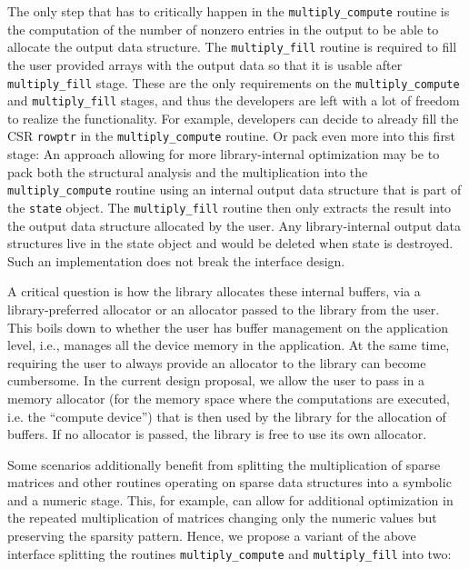 \documentclass{article}
\begin{document}
The only step that has to critically happen in the \texttt{multiply\_compute} routine is the computation of the number of nonzero entries in the output to be able to allocate the output data structure. The \texttt{multiply\_fill} routine is required to fill the user provided arrays with the output data so that it is usable after \texttt{multiply\_fill} stage. These are the only requirements on the \texttt{multiply\_compute} and \texttt{multiply\_fill} stages, and thus the developers are left with a lot of freedom to realize the functionality. For example, developers can decide to already fill the CSR \texttt{rowptr} in the \texttt{multiply\_compute} routine. Or pack even more into this first stage: An approach allowing for more library-internal optimization may be to pack both the structural analysis and the multiplication into the \texttt{multiply\_compute} routine using an internal output data structure that is part of the \texttt{state} object. The \texttt{multiply\_fill} routine then only extracts the result into the output data structure allocated by the user. Any library-internal output data structures live in the state object and would be deleted when state is destroyed. Such an implementation does not break the interface design.

A critical question is how the library allocates these internal buffers, via a library-preferred allocator or an allocator passed to the library from the user. This boils down to whether the user has buffer management on the application level, i.e., manages all the device memory in the application. At the same time, requiring the user to always provide an allocator to the library can become cumbersome. In the current design proposal, we allow the user to pass in a memory allocator (for the memory space where the computations are executed, i.e. the ``compute device'') that is then used by the library for the allocation of buffers. If no allocator is passed, the library is free to use its own allocator.

Some scenarios additionally benefit from splitting the multiplication of sparse matrices and other routines operating on sparse data structures into a symbolic and a numeric stage. This, for example, can allow for additional optimization in the repeated multiplication of matrices changing only the numeric values but preserving the sparsity pattern. Hence, we propose a variant of the above interface splitting the routines
\texttt{multiply\_compute} and
\texttt{multiply\_fill} into two:
\end{document}
